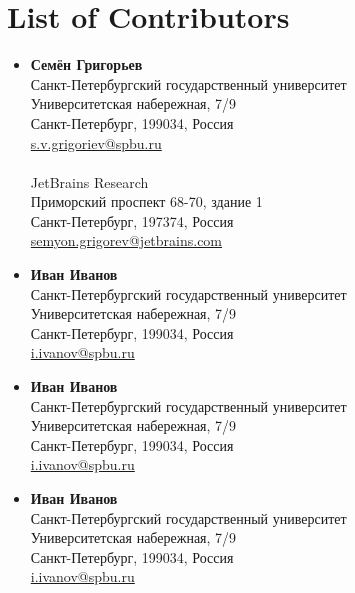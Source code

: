 ﻿\chapter*{List of Contributors}

\begin{multicols}{2}
    \begin{itemize}
        \item \textbf{Семён Григорьев} \\
              Санкт-Петербургский государственный университет \\
              Университетская набережная, 7/9 \\
              Санкт-Петербург, 199034, Россия \\
              \url{s.v.grigoriev@spbu.ru}\\
              \\
              JetBrains Research \\
              Приморский проспект 68-70, здание 1 \\
              Санкт-Петербург, 197374, Россия \\
              \url{semyon.grigorev@jetbrains.com}


        \item \textbf{Иван Иванов} \\
              Санкт-Петербургский государственный университет \\
              Университетская набережная, 7/9 \\
              Санкт-Петербург, 199034, Россия \\
              \url{i.ivanov@spbu.ru}

        \item \textbf{Иван Иванов} \\
              Санкт-Петербургский государственный университет \\
              Университетская набережная, 7/9 \\
              Санкт-Петербург, 199034, Россия \\
              \url{i.ivanov@spbu.ru}

        \item \textbf{Иван Иванов} \\
              Санкт-Петербургский государственный университет \\
              Университетская набережная, 7/9 \\
              Санкт-Петербург, 199034, Россия \\
              \url{i.ivanov@spbu.ru}


\end{itemize}
\end{multicols}
